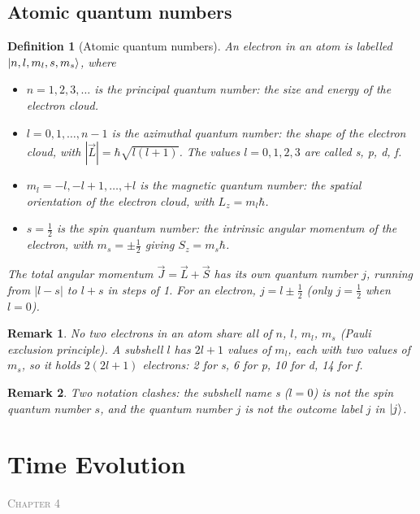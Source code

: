 \documentclass{article}
\newtheorem{definition}{Definition}
\newtheorem{remark}{Remark}
\newcommand{\chapterstart}[1]{\noindent\hfill{\small\scshape\textcolor{gray}{Chapter #1}}\par}
\begin{document}
\subsection{Atomic quantum numbers}
\label{sec:atomic}
\begin{definition}[Atomic quantum numbers]
    An electron in an atom is labelled $\ket{n,l,m_l,s,m_s}$, where
    \begin{itemize}
        \item $n = 1,2,3,\dots$ is the \emph{principal} quantum number: the size and energy of the electron cloud.
        \item $l = 0,1,\dots,n-1$ is the \emph{azimuthal} quantum number: the shape of the electron cloud, with $|\vec{L}| = \hbar\sqrt{l(l+1)}$. The values $l = 0,1,2,3$ are called s, p, d, f.
        \item $m_l = -l, -l+1, \dots, +l$ is the \emph{magnetic} quantum number: the spatial orientation of the electron cloud, with $L_z = m_l\hbar$.
        \item $s = \tfrac12$ is the \emph{spin} quantum number: the intrinsic angular momentum of the electron, with $m_s = \pm\tfrac12$ giving $S_z = m_s\hbar$.
    \end{itemize}
    The total angular momentum $\vec{J} = \vec{L} + \vec{S}$ has its own quantum number $j$, running from $|l-s|$ to $l+s$ in steps of 1. For an electron, $j = l \pm \tfrac12$ (only $j = \tfrac12$ when $l = 0$).
\end{definition}
\begin{remark}
    No two electrons in an atom share all of $n$, $l$, $m_l$, $m_s$ (Pauli exclusion principle). A subshell $l$ has $2l+1$ values of $m_l$, each with two values of $m_s$, so it holds $2(2l+1)$ electrons: 2 for s, 6 for p, 10 for d, 14 for f.
\end{remark}
\begin{remark}
    Two notation clashes: the subshell name s ($l = 0$) is not the spin quantum number $s$, and the quantum number $j$ is not the outcome label $j$ in $\ket{j}$.
\end{remark}


\section{Time Evolution}
\label{sec:time}
\chapterstart{4}
\end{document}
